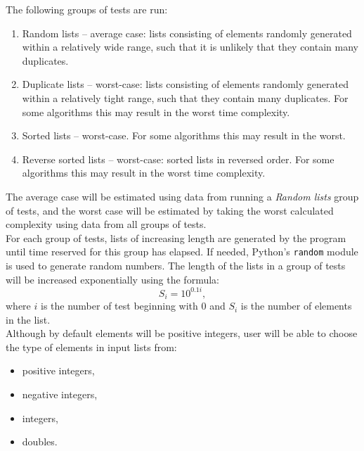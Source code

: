 \documentclass{article}
\begin{document}
                \noindent The following groups of tests are run:
                \begin{enumerate}
                    \item Random lists – average case: lists consisting of elements randomly generated within a relatively wide range, such that it is unlikely that they contain many duplicates.
                    \item Duplicate lists – worst-case: lists consisting of elements randomly generated within a relatively tight range, such that they contain many duplicates. For some algorithms this may result in the worst time complexity.
                    \item Sorted lists – worst-case. For some algorithms this may result in the worst.
                    \item Reverse sorted lists – worst-case: sorted lists in reversed order. For some algorithms this may result in the worst time complexity.
                \end{enumerate}
                
                 The average case will be estimated using data from running a \textit{Random lists} group of tests, and the worst case will be estimated by taking the worst calculated complexity using data from all groups of tests.\\
                
                \noindent For each group of tests, lists of increasing length are generated by the program until time reserved for this group has elapsed. If needed, Python's \verb|random| module is used to generate random numbers. The length of the lists in a group of tests will be increased exponentially using the formula: $$S_i = 10^{0.1i},$$ where $i$ is the number of test beginning with 0 and $S_i$ is the number of elements in the list.\\
                
                Although by default elements will be positive integers, user will be able to choose the type of elements in input lists from:
                \begin{itemize}
                    \item positive integers,
                    \item negative integers,
                    \item integers,
                    \item doubles.
                \end{itemize} 
                
\end{document}
